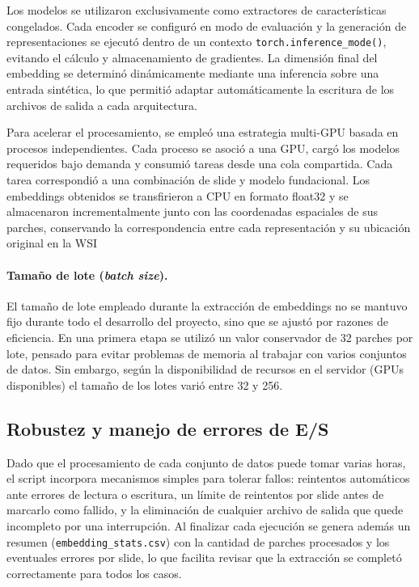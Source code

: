 Los modelos se utilizaron exclusivamente como extractores de características congelados. Cada encoder se configuró en modo de evaluación y la generación de representaciones se ejecutó dentro de un contexto \texttt{torch.inference\_mode()}, evitando el cálculo y almacenamiento de gradientes. La dimensión final del embedding se determinó dinámicamente mediante una inferencia sobre una entrada sintética, lo que permitió adaptar automáticamente la escritura de los archivos de salida a cada arquitectura.

Para acelerar el procesamiento, se empleó una estrategia multi-GPU basada en procesos independientes. Cada proceso se asoció a una GPU, cargó los modelos requeridos bajo demanda y consumió tareas desde una cola compartida. Cada tarea correspondió a una combinación de slide y modelo fundacional. Los embeddings obtenidos se transfirieron a CPU en formato float32 y se almacenaron incrementalmente junto con las coordenadas espaciales de sus parches, conservando la correspondencia entre cada representación y su ubicación original en la WSI

\paragraph{Tamaño de lote (\textit{batch size}).}
El tamaño de lote empleado durante la extracción de embeddings no se mantuvo fijo
durante todo el desarrollo del proyecto, sino que se ajustó por razones de
eficiencia. En una primera etapa se utilizó un valor conservador de 32 parches
por lote, pensado para evitar problemas de memoria al trabajar con varios
conjuntos de datos. Sin embargo, según la disponibilidad de recursos en el servidor (GPUs disponibles)
el tamaño de los lotes varió entre 32 y 256. 

\subsection{Robustez y manejo de errores de E/S}
\label{sec:robustez-embeddings}

Dado que el procesamiento de cada conjunto de datos puede tomar varias horas, el
script incorpora mecanismos simples para tolerar fallos: reintentos automáticos
ante errores de lectura o escritura, un límite de reintentos por slide antes de
marcarlo como fallido, y la eliminación de cualquier archivo de salida que quede
incompleto por una interrupción. Al finalizar cada ejecución se genera además un
resumen (\texttt{embedding\_stats.csv}) con la cantidad de parches procesados y
los eventuales errores por slide, lo que facilita revisar que la extracción se
completó correctamente para todos los casos.

